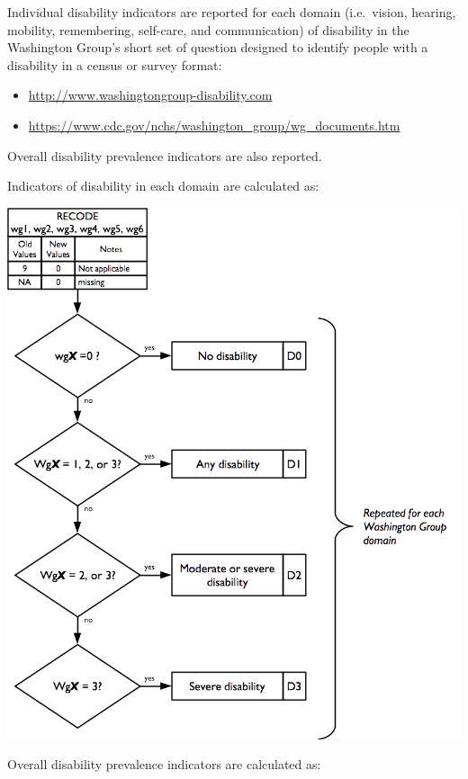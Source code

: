 \documentclass[12pt,a4paper]{book}
\theoremstyle{definition}
\theoremstyle{definition}
\theoremstyle{definition}
\theoremstyle{remark}
\begin{document}
Individual disability indicators are reported for each domain
(i.e.~vision, hearing, mobility, remembering, self-care, and
communication) of disability in the Washington Group's short set of
question designed to identify people with a disability in a census or
survey format:

\begin{itemize}
\item
  \url{http://www.washingtongroup-disability.com}
\item
  \url{https://www.cdc.gov/nchs/washington_group/wg_documents.htm}
\end{itemize}

Overall disability prevalence indicators are also reported.

Indicators of disability in each domain are calculated as:

\begin{center}\includegraphics{figures/indicators16} \end{center}

Overall disability prevalence indicators are calculated as:
\end{document}
